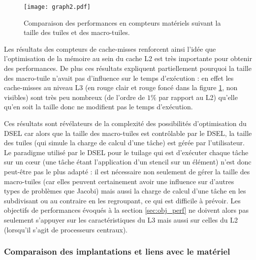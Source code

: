 \begin{figure}[!h]
  \caption{Comparaison des performances en compteurs matériels suivant la taille des tuiles et des macro-tuiles.}
  \label{graph:comp_tuile_cmiss}
  \texttt{[image: graph2.pdf]}
\end{figure}

Les résultats des compteurs de cache-misses renforcent ainsi l'idée que l'optimisation de la mémoire au sein du cache L2 est très importante pour obtenir des performances. De plus ces résultats expliquent partiellement pourquoi la taille des macro-tuile n'avait pas d'influence sur le temps d'exécution : en effet les cache-misses au niveau L3 (en rouge clair et rouge foncé dans la figure \ref{graph:comp_tuile_cmiss}, non visibles) sont très peu nombreux (de l'ordre de $1\%$ par rapport au L2) qu'elle qu'en soit la taille donc ne modifient pas le temps d'exécution.

Ces résultats sont révélateurs de la complexité des possibilités d'optimisation du DSEL car alors que la taille des macro-tuiles est contrôlable par le DSEL, la taille des tuiles (qui simule la charge de calcul d'une tâche) est gérée par l'utilisateur. Le paradigme utilisé par le DSEL pour le tuilage qui est d'exécuter chaque tâche sur un cœur (une tâche étant l'application d'un stencil sur un élément) n'est donc peut-être pas le plus adapté : il est nécessaire non seulement de gérer la taille des macro-tuiles (car elles peuvent certainement avoir une influence sur d'autres types de problèmes que Jacobi) mais aussi la charge de calcul d'une tâche en les subdivisant ou au contraire en les regroupant, ce qui est difficile à prévoir. Les objectifs de performances évoqués à la section \ref{sec:obj_perf} ne doivent alors pas seulement s'appuyer sur les caractéristiques du L3 mais aussi sur celles du L2 (lorsqu'il s'agit de processeurs centraux).


\subsubsection*{Comparaison des implantations et liens avec le matériel}

